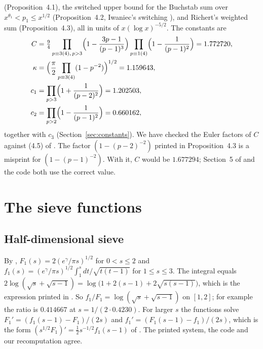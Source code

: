 \documentclass[11pt,a4paper]{amsart}
\theoremstyle{remark}
\numberwithin{equation}{section}
\newcommand{\eg}{e^{\gamma}}
\begin{document}
(Proposition~4.1), the switched upper bound for the Buchstab sum over $x^{\theta_1}<p_1\le x^{1/2}$
(Proposition~4.2, Iwaniec's switching \cite{Iw72}), and Richert's weighted sum (Proposition~4.3), all in units of $x(\log x)^{-5/2}$. The constants
are
\begin{align*}
C&=\tfrac94\prod_{p\equiv3(4),\,p>3}\Bigl(1-\frac{3p-1}{(p-1)^3}\Bigr)\prod_{p\equiv1(4)}\Bigl(1-\frac1{(p-1)^2}\Bigr)
=1.772720,\\
\kappa&=\Bigl(\frac\pi2\prod_{p\equiv3(4)}(1-p^{-2})\Bigr)^{1/2}=1.159643,\\
c_1&=\prod_{p>3}\Bigl(1+\frac1{(p-2)^2}\Bigr)=1.202503,\\
c_2&=\prod_{p>2}\Bigl(1-\frac1{(p-1)^2}\Bigr)=0.660162,
\end{align*}
together with $c_3$ (Section~\ref{sec:constants}). We have checked the Euler factors of $C$ against (4.5) of
\cite{NX}. The factor $(1-(p-2)^{-2})$ printed in Proposition~4.3 is a misprint for $(1-(p-1)^{-2})$. With it, $C$
would be $1.677294$; Section~5 of \cite{NX} and the code both use the correct value.

\section{The sieve functions}\label{sec:functions}

\subsection{Half-dimensional sieve}
By \cite[(14.2)--(14.3)]{FI}, $F_1(s)=2(\eg/\pi s)^{1/2}$ for $0<s\le2$ and
$f_1(s)=(\eg/\pi s)^{1/2}\int_1^s dt/\sqrt{t(t-1)}$ for $1\le s\le3$. The integral equals
$2\log(\sqrt s+\sqrt{s-1})=\log\bigl(1+2(s-1)+2\sqrt{s(s-1)}\bigr)$, which is the expression printed in \cite[\S5]{NX}.
So $f_1/F_1=\log(\sqrt s+\sqrt{s-1})$ on $[1,2]$; for example the ratio is $0.414667$ at $s=1/(2\cdot0.4230)$.
For larger $s$ the functions solve $F_1'=(f_1(s-1)-F_1)/(2s)$ and $f_1'=(F_1(s-1)-f_1)/(2s)$, which is the form
$(s^{1/2}F_1)'=\frac12s^{-1/2}f_1(s-1)$ of \cite[Lemma~3.6]{NX}. The printed system, the code and our recomputation
agree.
\end{document}
